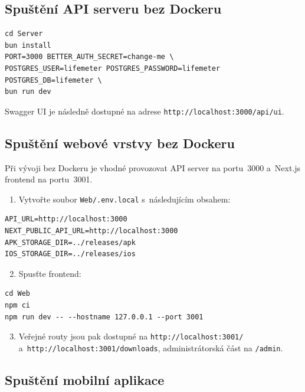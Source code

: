\subsection{Spuštění API serveru bez Dockeru}

\begin{verbatim}
cd Server
bun install
PORT=3000 BETTER_AUTH_SECRET=change-me \
POSTGRES_USER=lifemeter POSTGRES_PASSWORD=lifemeter POSTGRES_DB=lifemeter \
bun run dev
\end{verbatim}

Swagger UI je následně dostupné na adrese \texttt{http://localhost:3000/api/ui}.

\subsection{Spuštění webové vrstvy bez Dockeru}

Při vývoji bez Dockeru je vhodné provozovat API server na portu~3000 a~Next.js
frontend na portu~3001.

\begin{enumerate}
  \item Vytvořte soubor \texttt{Web/.env.local} s~následujícím obsahem:
\end{enumerate}

\begin{verbatim}
API_URL=http://localhost:3000
NEXT_PUBLIC_API_URL=http://localhost:3000
APK_STORAGE_DIR=../releases/apk
IOS_STORAGE_DIR=../releases/ios
\end{verbatim}

\begin{enumerate}
  \setcounter{enumi}{1}
  \item Spusťte frontend:
\end{enumerate}

\begin{verbatim}
cd Web
npm ci
npm run dev -- --hostname 127.0.0.1 --port 3001
\end{verbatim}

\begin{enumerate}
  \setcounter{enumi}{2}
  \item Veřejné routy jsou pak dostupné na \texttt{http://localhost:3001/}
  a~\texttt{http://localhost:3001/downloads}, administrátorská část na
  \texttt{/admin}.
\end{enumerate}

\subsection{Spuštění mobilní aplikace}

